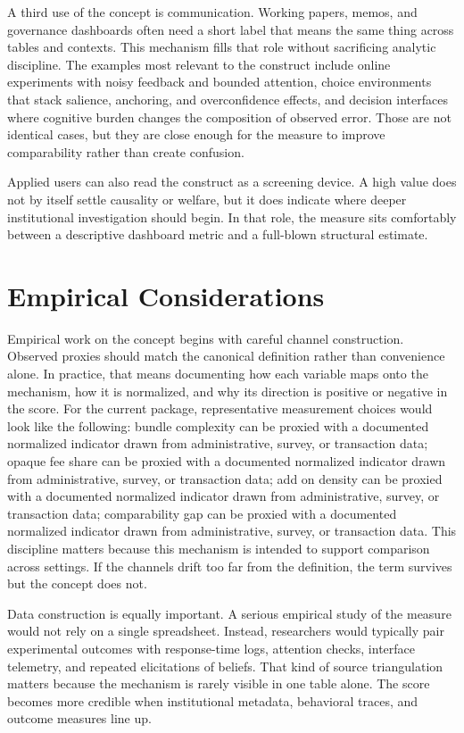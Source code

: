 \documentclass[12pt]{article}
\begin{document}
A third use of the concept is communication. Working papers, memos, and governance dashboards often need a short label that means the same thing across tables and contexts. This mechanism fills that role without sacrificing analytic discipline. The examples most relevant to the construct include online experiments with noisy feedback and bounded attention, choice environments that stack salience, anchoring, and overconfidence effects, and decision interfaces where cognitive burden changes the composition of observed error. Those are not identical cases, but they are close enough for the measure to improve comparability rather than create confusion.

Applied users can also read the construct as a screening device. A high value does not by itself settle causality or welfare, but it does indicate where deeper institutional investigation should begin. In that role, the measure sits comfortably between a descriptive dashboard metric and a full-blown structural estimate.

\section{Empirical Considerations}
Empirical work on the concept begins with careful channel construction. Observed proxies should match the canonical definition rather than convenience alone. In practice, that means documenting how each variable maps onto the mechanism, how it is normalized, and why its direction is positive or negative in the score. For the current package, representative measurement choices would look like the following: bundle complexity can be proxied with a documented normalized indicator drawn from administrative, survey, or transaction data; opaque fee share can be proxied with a documented normalized indicator drawn from administrative, survey, or transaction data; add on density can be proxied with a documented normalized indicator drawn from administrative, survey, or transaction data; comparability gap can be proxied with a documented normalized indicator drawn from administrative, survey, or transaction data. This discipline matters because this mechanism is intended to support comparison across settings. If the channels drift too far from the definition, the term survives but the concept does not.

Data construction is equally important. A serious empirical study of the measure would not rely on a single spreadsheet. Instead, researchers would typically pair experimental outcomes with response-time logs, attention checks, interface telemetry, and repeated elicitations of beliefs. That kind of source triangulation matters because the mechanism is rarely visible in one table alone. The score becomes more credible when institutional metadata, behavioral traces, and outcome measures line up.
\end{document}
